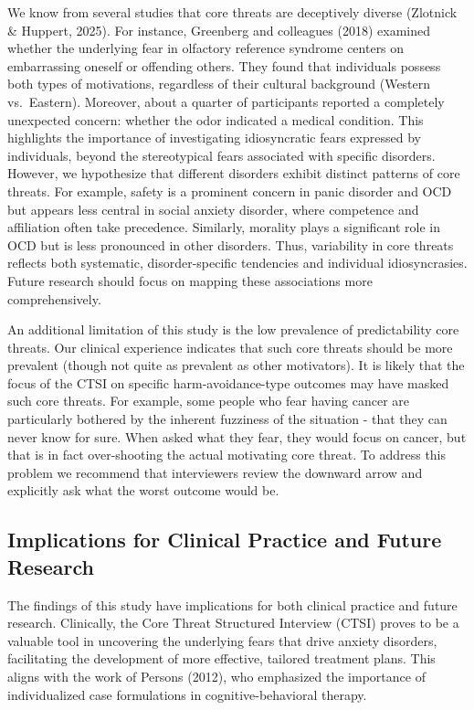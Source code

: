 \documentclass[
  man,floatsintext]{apa7}
\begin{document}
We know from several studies that core threats are deceptively diverse (Zlotnick \& Huppert, 2025).
For instance, Greenberg and colleagues (2018) examined whether the underlying fear in olfactory reference syndrome centers on embarrassing oneself or offending others.
They found that individuals possess both types of motivations, regardless of their cultural background (Western vs.~Eastern).
Moreover, about a quarter of participants reported a completely unexpected concern: whether the odor indicated a medical condition.
This highlights the importance of investigating idiosyncratic fears expressed by individuals, beyond the stereotypical fears associated with specific disorders.
However, we hypothesize that different disorders exhibit distinct patterns of core threats.
For example, safety is a prominent concern in panic disorder and OCD but appears less central in social anxiety disorder, where competence and affiliation often take precedence.
Similarly, morality plays a significant role in OCD but is less pronounced in other disorders.
Thus, variability in core threats reflects both systematic, disorder-specific tendencies and individual idiosyncrasies.
Future research should focus on mapping these associations more comprehensively.

An additional limitation of this study is the low prevalence of predictability core threats.
Our clinical experience indicates that such core threats should be more prevalent (though not quite as prevalent as other motivators).
It is likely that the focus of the CTSI on specific harm-avoidance-type outcomes may have masked such core threats.
For example, some people who fear having cancer are particularly bothered by the inherent fuzziness of the situation - that they can never know for sure.
When asked what they fear, they would focus on cancer, but that is in fact over-shooting the actual motivating core threat.
To address this problem we recommend that interviewers review the downward arrow and explicitly ask what the worst outcome would be.

\subsection{Implications for Clinical Practice and Future Research}\label{implications-for-clinical-practice-and-future-research}

The findings of this study have implications for both clinical practice and future research.
Clinically, the Core Threat Structured Interview (CTSI) proves to be a valuable tool in uncovering the underlying fears that drive anxiety disorders, facilitating the development of more effective, tailored treatment plans.
This aligns with the work of Persons (2012), who emphasized the importance of individualized case formulations in cognitive-behavioral therapy.
\end{document}
